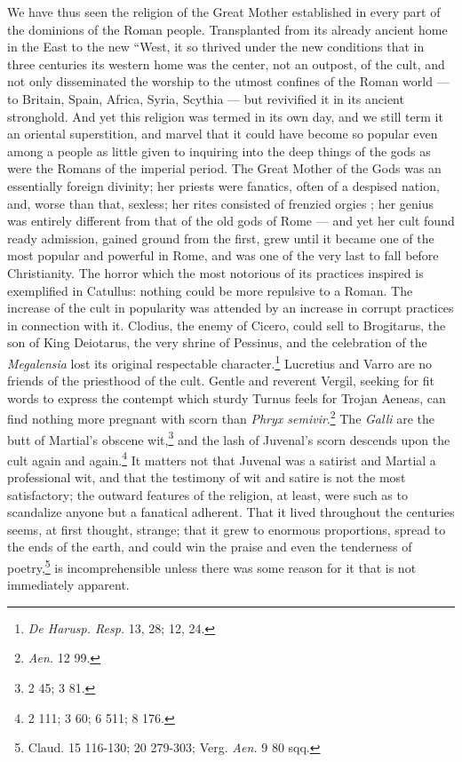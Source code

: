 \documentclass[a4paper, 11pt, oneside, polutonikogreek, english]{article}
\begin{document}
We have thus seen the religion of the Great Mother established in every part of the dominions of the Roman people. Transplanted from its already ancient home in the East to the new ``West, it so thrived under the new conditions that in three centuries its western home was the center, not an outpost, of the cult, and not only disseminated the worship to the utmost confines of the Roman world --- to Britain, Spain, Africa, Syria, Scythia --- but revivified it in its ancient stronghold. And yet this religion was termed in its own day, and we still term it an oriental superstition, and marvel that it could have become so popular even among a people as little given to inquiring into the deep things of the gods as were the Romans of the imperial period. The Great Mother of the Gods was an essentially foreign divinity; her priests were fanatics, often of a despised nation, and, worse than that, sexless; her rites consisted of frenzied orgies ; her genius was entirely different from that of the old gods of Rome --- and yet her cult found ready admission, gained ground from the first, grew until it became one of the most popular and powerful in Rome, and was one of the very last to fall before Christianity. The horror which the most notorious of its practices inspired is exemplified in Catullus: nothing could be more repulsive to a Roman. The increase of the cult in popularity was attended by an increase in corrupt practices in connection with it. Clodius, the enemy of Cicero, could sell to Brogitarus, the son of King Deiotarus, the very shrine of Pessinus, and the celebration of the \emph{Megalensia} lost its original respectable character.\footnote{\emph{De Harusp. Resp.} 13, 28; 12, 24.} Lucretius and Varro are no friends of the priesthood of the cult. Gentle and reverent Vergil, seeking for fit words to express the contempt which sturdy Turnus feels for Trojan Aeneas, can find nothing more pregnant with scorn than \emph{Phryx semivir}.\footnote{\emph{Aen.} 12 99.} The \emph{Galli} are the butt of Martial's obscene wit,\footnote{2 45; 3 81.} and the lash of Juvenal's scorn descends upon the cult again and again.\footnote{2 111; 3 60; 6 511; 8 176.} It matters not that Juvenal was a satirist and Martial a professional wit, and that the testimony of wit and satire is not the most satisfactory; the outward features of the religion, at least, were such as to scandalize anyone but a fanatical adherent. That it lived throughout the centuries seems, at first thought, strange; that it grew to enormous proportions, spread to the ends of the earth, and could win the praise and even the tenderness of poetry,\footnote{Claud. 15 116-130; 20 279-303; Verg. \emph{Aen.} 9 80 sqq.} is incomprehensible unless there was some reason for it that is not immediately apparent.
\end{document}
